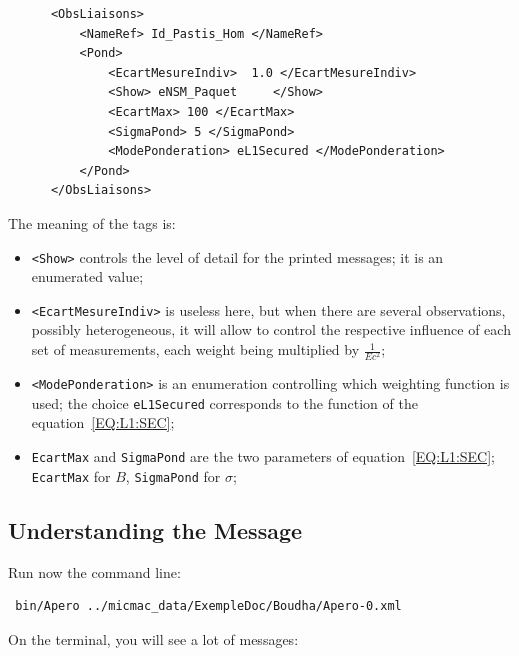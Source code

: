 {\scriptsize
\begin{verbatim}
      <ObsLiaisons>
          <NameRef> Id_Pastis_Hom </NameRef>
          <Pond>
              <EcartMesureIndiv>  1.0 </EcartMesureIndiv>
              <Show> eNSM_Paquet     </Show>
              <EcartMax> 100 </EcartMax>
              <SigmaPond> 5 </SigmaPond>
              <ModePonderation> eL1Secured </ModePonderation>
          </Pond>
      </ObsLiaisons>
\end{verbatim}
}

The meaning of the tags is:

\begin{itemize}
   \item  {\tt <Show>} controls the level of detail for the printed messages;
          it is an enumerated value;
   \item  {\tt <EcartMesureIndiv>} is useless here, but when there are several
          observations, possibly heterogeneous, it will allow to control the
          respective influence of each set of measurements, each weight being
          multiplied by $\frac1{Ec^2}$;
   \item  {\tt <ModePonderation>} is an enumeration controlling which weighting
          function is used; the choice {\tt eL1Secured} corresponds to the function
          of the equation~\ref{EQ:L1:SEC};
   \item  {\tt EcartMax} and {\tt SigmaPond} are the two parameters of equation~\ref{EQ:L1:SEC};
          {\tt EcartMax}  for $B$,  {\tt SigmaPond}  for $\sigma$;
\end{itemize}


\subsection{Understanding the Message}

Run now the command line:

{\scriptsize
\begin{verbatim}
 bin/Apero ../micmac_data/ExempleDoc/Boudha/Apero-0.xml 
\end{verbatim}
}

On the terminal, you will see a lot of messages:

